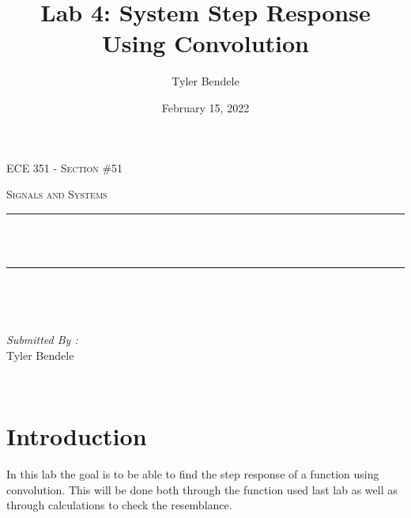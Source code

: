 \documentclass[12pt]{report}
\title{Lab 4: System Step Response Using Convolution}
\author{Tyler Bendele}
\date{February 15, 2022}
\makeatletter
\let\thetitle\@title
\makeatother
\begin{document}
\begin{titlepage}
\centering
\vspace*{0.5 cm}

\begin{center}    \textsc{\Large   ECE 351 - Section \#51 }\\[2.0 cm]
\end{center}%
\textsc{\Large Signals and Systems  }\\[0.5 cm] %

\rule{\linewidth}{0.2 mm} \\[0.4 cm]
{ \huge \bfseries \thetitle}\\
\rule{\linewidth}{0.2 mm} \\[1.5 cm]
\begin{minipage}{0.4\textwidth}
\begin{flushleft} \large
\end{flushleft}
\end{minipage}~
\begin{minipage}{0.4\textwidth}
\begin{flushright} \large
\emph{Submitted By :} \\
Tyler Bendele
\end{flushright}
\end{minipage}\\[2 cm]
\end{titlepage}
\tableofcontents
\pagebreak
\renewcommand{\thesection}{\arabic{section}}
\section{Introduction}
In this lab the goal is to be able to find the step response of
a function using convolution. This will be done both through 
the function used last lab as well as through calculations to 
check the resemblance.
\end{document}
